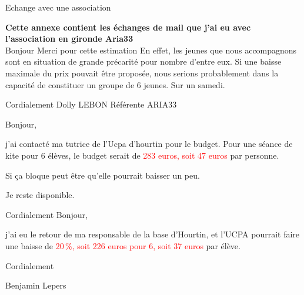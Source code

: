 \documentclass[10pt,a4paper]{beamer}
\begin{document}
\begin{frame}{Echange avec une association}
\small{
\textbf{Cette annexe contient les échanges de mail que j'ai eu avec l'association 
en gironde Aria33} \\










\bigskip
Bonjour
Merci pour cette estimation
En effet, les jeunes que nous accompagnons sont en situation de grande
précarité pour nombre d'entre eux. Si une baisse maximale du prix
pouvait être proposée, nous serions probablement dans la capacité
de constituer un groupe de 6 jeunes. Sur un samedi.

Cordialement
Dolly LEBON
Référente ARIA33

\bigskip
Bonjour,

j'ai contacté ma tutrice de l'Ucpa d'hourtin pour le budget.
Pour une séance de kite  pour 6 élèves, le budget serait  de \textcolor{red} {283 euros, soit 47 euros} par personne.

Si ça bloque peut être qu'elle pourrait baisser un peu.


Je reste disponible.

Cordialement
\bigskip
Bonjour,

j'ai eu le retour de ma responsable de la base d'Hourtin, et l'UCPA
pourrait faire une baisse de \textcolor{red}{20\,\%, soit 226 euros pour 6, soit 37 euros}
par élève.

Cordialement

Benjamin Lepers}
\end{frame}
\end{document}
